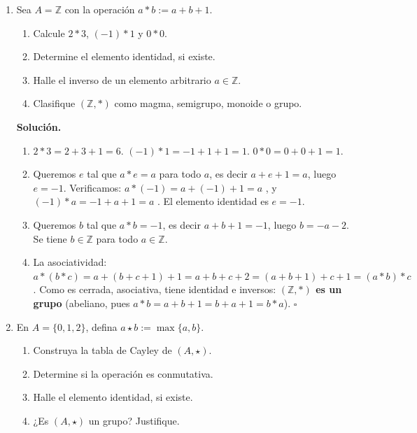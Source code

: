 \begin{enumerate}[label=\textbf{1.\arabic*.}]

\item Sea \(A = \mathbb{Z}\) con la operación \(a * b := a + b + 1\).
\begin{enumerate}[label=\alph*)]
    \item Calcule \(2 * 3\), \((-1)*1\) y \(0*0\).
    \item Determine el elemento identidad, si existe.
    \item Halle el inverso de un elemento arbitrario \(a \in \mathbb{Z}\).
    \item Clasifique \((\mathbb{Z}, *)\) como magma, semigrupo, monoide o grupo.
\end{enumerate}

\textbf{Solución.}
\begin{enumerate}[label=\alph*)]
    \item \(2*3 = 2+3+1 = 6\). \quad \((-1)*1 = -1+1+1 = 1\). \quad \(0*0 = 0+0+1 = 1\).

    \item Queremos \(e\) tal que \(a*e = a\) para todo \(a\), es decir \(a+e+1=a\),
    luego \(e = -1\). Verificamos: \(a*(-1) = a+(-1)+1 = a\) \checkmark, y
    \((-1)*a = -1+a+1 = a\) \checkmark. El elemento identidad es \(e = -1\).

    \item Queremos \(b\) tal que \(a*b = -1\), es decir \(a+b+1=-1\), luego
    \(b = -a-2\). Se tiene \(b \in \mathbb{Z}\) para todo \(a \in \mathbb{Z}\).

    \item La asociatividad:
    \(a*(b*c) = a+(b+c+1)+1 = a+b+c+2 = (a+b+1)+c+1 = (a*b)*c\).
    Como es cerrada, asociativa, tiene identidad e inversos: \textbf{\((\mathbb{Z},*)\) es un grupo}
    (abeliano, pues \(a*b = a+b+1 = b+a+1 = b*a\)). \hfill\(\square\)
\end{enumerate}

\item En \(A = \{0,1,2\}\), defina \(a \star b := \max\{a,b\}\).
\begin{enumerate}[label=\alph*)]
    \item Construya la tabla de Cayley de \((A,\star)\).
    \item Determine si la operación es conmutativa.
    \item Halle el elemento identidad, si existe.
    \item ¿Es \((A,\star)\) un grupo? Justifique.
\end{enumerate}


\end{enumerate}

